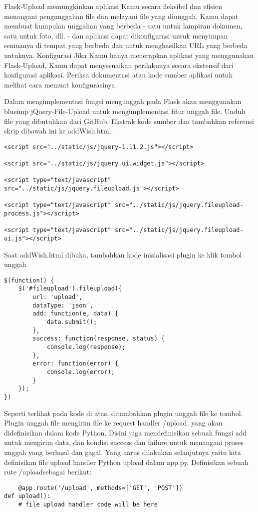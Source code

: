 \documentclass[12pt,a4paper]{article}
\begin{document}
Flask-Upload memungkinkan aplikasi Kamu secara fleksibel dan efisien menangani pengunggahan file dan melayani file yang diunggah. Kamu dapat membuat kumpulan unggahan yang berbeda - satu untuk lampiran dokumen, satu untuk foto, dll. - dan aplikasi dapat dikonfigurasi untuk menyimpan semuanya di tempat yang berbeda dan untuk menghasilkan URL yang berbeda untuknya.
Konfigurasi
Jika Kamu hanya menerapkan aplikasi yang menggunakan Flask-Upload, Kamu dapat menyesuaikan perilakunya secara ekstensif dari konfigurasi aplikasi. Periksa dokumentasi atau kode sumber aplikasi untuk melihat cara memuat konfigurasinya.


Dalam mengimplementasi fungsi mengunggah pada Flask akan menggunakan blueimp jQuery-File-Upload untuk mengimplementasi fitur unggah file. Unduh file yang dibutuhkan dari GitHub. Ekstrak kode sumber dan tambahkan referensi skrip dibawah ini ke addWish.html.
\begin{verbatim}
<script src="../static/js/jquery-1.11.2.js"></script>
 
<script src="../static/js/jquery.ui.widget.js"></script>
 
<script type="text/javascript" src="../static/js/jquery.fileupload.js"></script>
 
<script type="text/javascript" src="../static/js/jquery.fileupload-process.js"></script>
 
<script type="text/javascript" src="../static/js/jquery.fileupload-ui.js"></script>
\end{verbatim}

Saat addWish.html dibuka, tambahkan kode inisialisasi plugin ke klik tombol unggah.

\begin{verbatim}
$(function() {
    $('#fileupload').fileupload({
        url: 'upload',
        dataType: 'json',
        add: function(e, data) {
            data.submit();
        },
        success: function(response, status) {
            console.log(response);
        },
        error: function(error) {
            console.log(error);
        }
    });
})
\end{verbatim}
Seperti terlihat pada kode di atas, ditambahkan plugin unggah file ke tombol. Plugin unggah file mengirim file ke request handler /upload, yang akan didefinisikan dalam kode Python. Disini juga mendefinisikan sebuah fungsi add untuk mengirim data, dan kondisi success dan failure untuk menangani proses unggah yang berhasil dan gagal.
Yang harus dilakukan selanjutnya yaitu kita definisikan file upload handler Python upload dalam app.py. Definisikan sebuah rute /uploadsebagai berikut:
\begin{verbatim}
	@app.route('/upload', methods=['GET', 'POST'])
def upload():
    # file upload handler code will be here
    
\end{verbatim}
    
\end{document}
